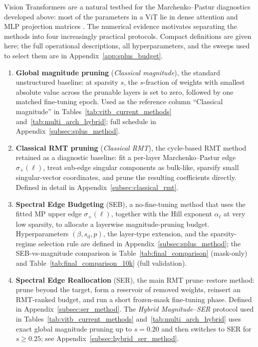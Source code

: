 \documentclass[11pt]{article}
\theoremstyle{plain}
\theoremstyle{definition}
\theoremstyle{remark}
\newcommand{\1}{\mathbf{1}}
\begin{document}
Vision Transformers are a natural testbed for the Marchenko--Pastur diagnostics developed above: most of the parameters in a ViT lie in dense attention and MLP projection matrices \cite{dosovitskiy2021image,vaswani2017attention}.  The numerical evidence motivates separating the methods into four increasingly practical protocols.  Compact definitions are given here; the full operational descriptions, all hyperparameters, and the sweeps used to select them are in Appendix~\ref{app:splus_budget}.
\begin{enumerate}[leftmargin=2em]
\item \textbf{Global magnitude pruning} (\emph{Classical magnitude}), the standard unstructured baseline: at sparsity \(s\), the \(s\)-fraction of weights with smallest absolute value across the prunable layers is set to zero, followed by one matched fine-tuning epoch.  Used as the reference column ``Classical magnitude'' in Tables~\ref{tab:vitb_current_methods} and~\ref{tab:multi_arch_hybrid}; full schedule in Appendix~\ref{subsec:splus_method}.
\item \textbf{Classical RMT pruning} (\emph{Classical RMT}), the cycle-based RMT method retained as a diagnostic baseline: fit a per-layer Marchenko--Pastur edge \(\sigma_+(\ell)\), treat sub-edge singular components as bulk-like, sparsify small singular-vector coordinates, and prune the resulting coefficients directly.  Defined in detail in Appendix~\ref{subsec:classical_rmt}.
\item \textbf{Spectral Edge Budgeting} (SEB), a no-fine-tuning method that uses the fitted MP upper edge \(\sigma_+(\ell)\), together with the Hill exponent \(\alpha_\ell\) at very low sparsity, to allocate a layerwise magnitude-pruning budget.  Hyperparameters \((\beta,s_{\mathrm{d}},p)\), the layer-type extension, and the sparsity-regime selection rule are defined in Appendix~\ref{subsec:splus_method}; the SEB-vs-magnitude comparison is Table~\ref{tab:final_comparison} (mask-only) and Table~\ref{tab:final_comparison_10k} (full validation).
\item \textbf{Spectral Edge Reallocation} (SER), the main RMT prune--restore method: prune beyond the target, form a reservoir of removed weights, reinsert an RMT-ranked budget, and run a short frozen-mask fine-tuning phase.  Defined in Appendix~\ref{subsec:ser_method}.  The \emph{Hybrid Magnitude--SER} protocol used in Tables~\ref{tab:vitb_current_methods} and~\ref{tab:multi_arch_hybrid} uses exact global magnitude pruning up to \(s=0.20\) and then switches to SER for \(s\ge0.25\); see Appendix~\ref{subsec:hybrid_ser_method}.
\end{enumerate}
\end{document}
